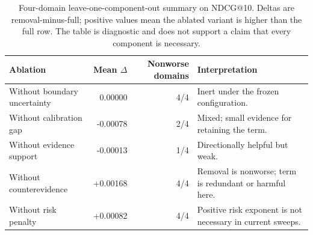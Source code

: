 \begin{table}[t]
\centering
\small
\caption{Four-domain leave-one-component-out summary on NDCG@10. Deltas are
removal-minus-full; positive values mean the ablated variant is higher than
the full \method{} row. The table is diagnostic and does not support a claim
that every component is necessary.}
\label{tab:ablation_ndcg10}
\begin{tabular}{lrrp{}}
\toprule
Ablation & Mean $\Delta$ & Nonworse domains & Interpretation \\
\midrule
Without boundary uncertainty & 0.00000 & 4/4 & Inert under the frozen configuration. \\
Without calibration gap & -0.00078 & 2/4 & Mixed; small evidence for retaining the term. \\
Without evidence support & -0.00013 & 1/4 & Directionally helpful but weak. \\
Without counterevidence & +0.00168 & 4/4 & Removal is nonworse; term is redundant or harmful here. \\
Without risk penalty & +0.00082 & 4/4 & Positive risk exponent is not necessary in current sweeps. \\
\bottomrule
\end{tabular}
\end{table}
